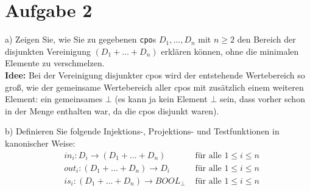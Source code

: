 \documentclass[ngerman,a4paper]{report}
\begin{document}
\section*{Aufgabe 2}
\begin{compactenum}
\item[a)] Zeigen Sie, wie Sie zu gegebenen \lstinline!cpo!s $D_1,...,D_n$ mit $n\geq 2$ den Bereich der disjunkten Vereinigung $(D_1 + ... + D_n)$ erklären können, ohne die minimalen Elemente zu verschmelzen.\\
\textbf{Idee:} 
Bei der Vereinigung disjunkter cpos wird der entstehende Wertebereich so groß, wie der gemeinsame Wertebereich aller cpos mit zusätzlich einem weiteren Element: ein gemeinsames $\bot$ (es kann ja kein Element $\bot$ sein, dass vorher schon in der Menge enthalten war, da die cpos disjunkt waren).
\item[b)] Definieren Sie folgende Injektions-, Projektions- und Testfunktionen in kanonischer Weise:\\
	\begin{align*}
		&in_i: D_i \rightarrow (D_1+...+D_n)& \text{ für alle } 1\leq i\leq n\\
		&out_i: (D_1+...+D_n)\rightarrow D_i& \text{ für alle } 1\leq i\leq n\\
		&is_i: (D_1+...+D_n)\rightarrow BOOL_\bot& \text{ für alle } 1\leq i\leq n\\
	\end{align*}
\end{compactenum}
\end{document}
